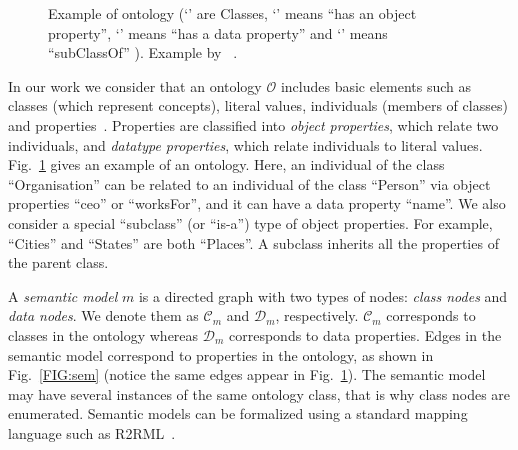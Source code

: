 \documentclass[letterpaper]{article} %
\newcommand{\citeasnoun}[1]{\citeauthor{#1}~\shortcite{#1}}
\begin{document}
\begin{figure}[ht]
{
}
\caption{Example of ontology
(`\protect{}' are Classes, `\protect{}' means ``has an object property'', 
`\protect{}' 
means ``has a data property'' and 
`\protect{}' means ``subClassOf'' ). Example by
\protect\citeasnoun{Taheriyan2013}.
}
\label{FIG:onto}
\vspace{-3mm}
\end{figure}

In our work we consider that an ontology $\mathcal{O}$ includes basic elements such 
as classes (which represent concepts), literal values, individuals (members of classes) and properties~\cite{Spanos:semweb}.
Properties are classified into \emph{object properties}, which relate two 
individuals, 
and \emph{datatype properties}, which relate individuals to literal values.
Fig.~\ref{FIG:onto} gives an example of an ontology. 
Here, an individual of the class ``Organisation'' can be related to an individual of the class ``Person'' via object properties ``ceo'' or ``worksFor'', and it can have a data property ``name''. 
We also consider a special ``subclass'' (or ``is-a'') type of object properties.
For 
example, ``Cities'' and ``States'' are both ``Places''. 
A subclass inherits all the properties of the parent class.

A \emph{semantic model} $m$ is a directed graph with two types of nodes: 
\emph{class nodes} and \emph{data nodes}. 
We denote them as $\mathcal{C}_m$ and $\mathcal{D}_m$, respectively.
$ \mathcal{C}_m$ corresponds to classes in the ontology 
whereas $\mathcal{D}_m$ corresponds to data 
properties. 
Edges in the semantic model correspond to properties in the ontology, as 
shown in Fig.~\ref{FIG:sem} (notice the same edges appear in Fig.~\ref{FIG:onto}).
The semantic model may have several instances of the same ontology class, that is why class nodes are enumerated.
Semantic models can be formalized using a standard mapping language such as R2RML~\cite{r2rml}.
\end{document}
